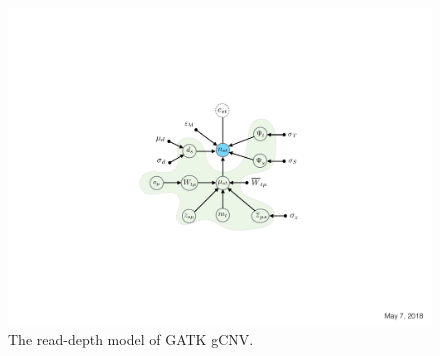 \documentclass[sigplan]{acmart}\settopmatter{printfolios=true,printccs=false,printacmref=false}
\begin{document}
\begin{figure}
\includegraphics[width=\columnwidth*3/4]{figures/germline-cnv-caller-model/denoising_component.pdf}
\caption{The read-depth model of GATK gCNV.}
\label{fig:denoising_component}
\end{figure}
\end{document}
